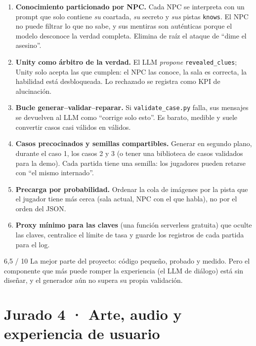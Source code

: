 \documentclass[11pt,a4paper]{article}
\newcommand{\file}[1]{\texttt{\small #1}}
\begin{document}
\begin{inedito}
\begin{enumerate}
\item \textbf{Conocimiento particionado por NPC.} Cada NPC se interpreta con un prompt que solo
contiene \emph{su} coartada, \emph{su} secreto y \emph{sus} pistas \texttt{knows}. El NPC no puede
filtrar lo que no sabe, y sus mentiras son auténticas porque el modelo desconoce la verdad completa.
Elimina de raíz el ataque de ``dime el asesino''.
\item \textbf{Unity como árbitro de la verdad.} El LLM \emph{propone} \texttt{revealed\_clues}; Unity
solo acepta las que cumplen: el NPC las conoce, la sala es correcta, la habilidad está desbloqueada.
Lo rechazado se registra como KPI de alucinación.
\item \textbf{Bucle generar--validar--reparar.} Si \file{validate\_case.py} falla, sus mensajes se
devuelven al LLM como ``corrige solo esto''. Es barato, medible y suele convertir casos casi válidos
en válidos.
\item \textbf{Casos precocinados y semillas compartibles.} Generar en segundo plano, durante el caso
1, los casos 2 y 3 (o tener una biblioteca de casos validados para la demo). Cada partida tiene una
semilla: los jugadores pueden retarse con ``el mismo internado''.
\item \textbf{Precarga por probabilidad.} Ordenar la cola de imágenes por la pista que el jugador
tiene más cerca (sala actual, NPC con el que habla), no por el orden del JSON.
\item \textbf{Proxy mínimo para las claves} (una función serverless gratuita) que oculte las claves,
centralice el límite de tasa y guarde los registros de cada partida para el log.
\end{enumerate}
\end{inedito}

\begin{veredicto}{6,5 / 10}
La mejor parte del proyecto: código pequeño, probado y medido. Pero el componente que más puede
romper la experiencia (el LLM de diálogo) está sin diseñar, y el generador aún no supera su propia
validación.
\end{veredicto}

\section{Jurado 4 · Arte, audio y experiencia de usuario}
\end{document}
